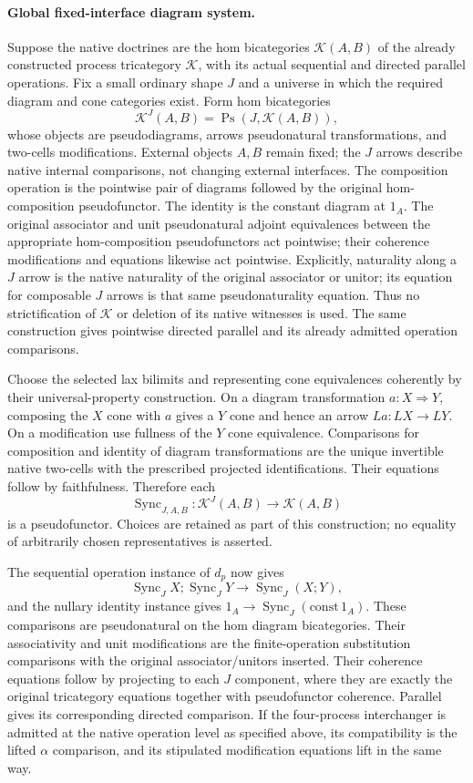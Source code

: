 \documentclass{article}
\begin{document}
\paragraph{Global fixed-interface diagram system.} Suppose the native doctrines are the hom bicategories $\mathcal K(A,B)$ of the already constructed process tricategory $\mathcal K$, with its actual sequential and directed parallel operations. Fix a small ordinary shape $J$ and a universe in which the required diagram and cone categories exist. Form hom bicategories
\[
 \mathcal K^J(A,B)=\operatorname{Ps}(J,\mathcal K(A,B)),
\]
whose objects are pseudodiagrams, arrows pseudonatural transformations, and two-cells modifications. External objects $A,B$ remain fixed; the $J$ arrows describe native internal comparisons, not changing external interfaces. The composition operation is the pointwise pair of diagrams followed by the original hom-composition pseudofunctor. The identity is the constant diagram at $1_A$. The original associator and unit pseudonatural adjoint equivalences between the appropriate hom-composition pseudofunctors act pointwise; their coherence modifications and equations likewise act pointwise. Explicitly, naturality along a $J$ arrow is the native naturality of the original associator or unitor; its equation for composable $J$ arrows is that same pseudonaturality equation. Thus no strictification of $\mathcal K$ or deletion of its native witnesses is used. The same construction gives pointwise directed parallel and its already admitted operation comparisons.

Choose the selected lax bilimits and representing cone equivalences coherently by their universal-property construction. On a diagram transformation $a:X\Rightarrow Y$, composing the $X$ cone with $a$ gives a $Y$ cone and hence an arrow $L a:L X\to L Y$. On a modification use fullness of the $Y$ cone equivalence. Comparisons for composition and identity of diagram transformations are the unique invertible native two-cells with the prescribed projected identifications. Their equations follow by faithfulness. Therefore each
\[
 \operatorname{Sync}_{J,A,B}:\mathcal K^J(A,B)\to\mathcal K(A,B)
\]
is a pseudofunctor. Choices are retained as part of this construction; no equality of arbitrarily chosen representatives is asserted.

The sequential operation instance of $d_p$ now gives
\[
 \operatorname{Sync}_J X;\operatorname{Sync}_J Y
 \longrightarrow\operatorname{Sync}_J(X;Y),
\]
and the nullary identity instance gives $1_A\to\operatorname{Sync}_J(\mathrm{const}\,1_A)$. These comparisons are pseudonatural on the hom diagram bicategories. Their associativity and unit modifications are the finite-operation substitution comparisons with the original associator/unitors inserted. Their coherence equations follow by projecting to each $J$ component, where they are exactly the original tricategory equations together with pseudofunctor coherence. Parallel gives its corresponding directed comparison. If the four-process interchanger is admitted at the native operation level as specified above, its compatibility is the lifted $\alpha$ comparison, and its stipulated modification equations lift in the same way.
\end{document}
